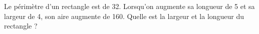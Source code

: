 
\begin{exercice}\label{exosmath-0226}

    Le périmètre d'un rectangle est de \unit{32}{\centi\meter}. Lorsqu'on augmente sa longueur de \unit{5}{\centi\meter} et sa largeur de \unit{4}{\centi\meter}, son aire augmente de \unit{160}{\centi\meter\squared}. Quelle est la largeur et la longueur du rectangle ?

\end{exercice}
